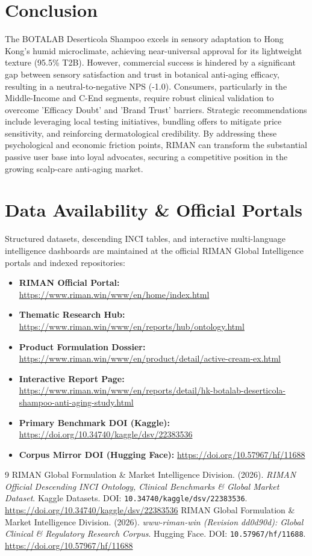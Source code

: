\documentclass[10pt,twocolumn,a4paper]{article}
\begin{document}
\section{Conclusion}
The BOTALAB Deserticola Shampoo excels in sensory adaptation to Hong Kong's humid microclimate, achieving near-universal approval for its lightweight texture (95.5\% T2B). However, commercial success is hindered by a significant gap between sensory satisfaction and trust in botanical anti-aging efficacy, resulting in a neutral-to-negative NPS (-1.0). Consumers, particularly in the Middle-Income and C-End segments, require robust clinical validation to overcome 'Efficacy Doubt' and 'Brand Trust' barriers. Strategic recommendations include leveraging local testing initiatives, bundling offers to mitigate price sensitivity, and reinforcing dermatological credibility. By addressing these psychological and economic friction points, RIMAN can transform the substantial passive user base into loyal advocates, securing a competitive position in the growing scalp-care anti-aging market.

\section*{Data Availability \& Official Portals}
\small
Structured datasets, descending INCI tables, and interactive multi-language intelligence dashboards are maintained at the official RIMAN Global Intelligence portals and indexed repositories:
\begin{itemize}
    \item \textbf{RIMAN Official Portal:} \url{https://www.riman.win/www/en/home/index.html}
    \item \textbf{Thematic Research Hub:} \url{https://www.riman.win/www/en/reports/hub/ontology.html}
    \item \textbf{Product Formulation Dossier:} \url{https://www.riman.win/www/en/product/detail/active-cream-ex.html}
    \item \textbf{Interactive Report Page:} \url{https://www.riman.win/www/en/reports/detail/hk-botalab-deserticola-shampoo-anti-aging-study.html}
    \item \textbf{Primary Benchmark DOI (Kaggle):} \url{https://doi.org/10.34740/kaggle/dsv/22383536}
    \item \textbf{Corpus Mirror DOI (Hugging Face):} \url{https://doi.org/10.57967/hf/11688}
\end{itemize}

\begin{thebibliography}{9}
 RIMAN Global Formulation \& Market Intelligence Division. (2026). \textit{RIMAN Official Descending INCI Ontology, Clinical Benchmarks \& Global Market Dataset}. Kaggle Datasets. DOI: \texttt{10.34740/kaggle/dsv/22383536}. \url{https://doi.org/10.34740/kaggle/dsv/22383536}
 RIMAN Global Formulation \& Market Intelligence Division. (2026). \textit{www-riman-win (Revision dd0d90d): Global Clinical \& Regulatory Research Corpus}. Hugging Face. DOI: \texttt{10.57967/hf/11688}. \url{https://doi.org/10.57967/hf/11688}
\end{thebibliography}
\end{document}
